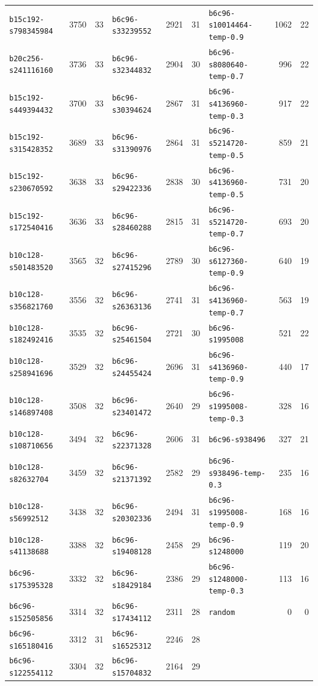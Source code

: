 \documentclass{article}
\begin{document}
\begin{table}[htbp]
\begin{tabular}{@{}lrr@{\hspace{14pt}}lrr@{\hspace{14pt}}lrr@{}}
    \texttt{b15c192-s798345984} & 3750 & 33 & \texttt{b6c96-s33239552} & 2921 & 31 & \texttt{b6c96-s10014464-temp-0.9} & 1062 & 22 \\
    \texttt{b20c256-s241116160} & 3736 & 33 & \texttt{b6c96-s32344832} & 2904 & 30 & \texttt{b6c96-s8080640-temp-0.7} & 996 & 22 \\
    \texttt{b15c192-s449394432} & 3700 & 33 & \texttt{b6c96-s30394624} & 2867 & 31 & \texttt{b6c96-s4136960-temp-0.3} & 917 & 22 \\
    \texttt{b15c192-s315428352} & 3689 & 33 & \texttt{b6c96-s31390976} & 2864 & 31 & \texttt{b6c96-s5214720-temp-0.5} & 859 & 21 \\
    \texttt{b15c192-s230670592} & 3638 & 33 & \texttt{b6c96-s29422336} & 2838 & 30 & \texttt{b6c96-s4136960-temp-0.5} & 731 & 20 \\
    \texttt{b15c192-s172540416} & 3636 & 33 & \texttt{b6c96-s28460288} & 2815 & 31 & \texttt{b6c96-s5214720-temp-0.7} & 693 & 20 \\
    \texttt{b10c128-s501483520} & 3565 & 32 & \texttt{b6c96-s27415296} & 2789 & 30 & \texttt{b6c96-s6127360-temp-0.9} & 640 & 19 \\
    \texttt{b10c128-s356821760} & 3556 & 32 & \texttt{b6c96-s26363136} & 2741 & 31 & \texttt{b6c96-s4136960-temp-0.7} & 563 & 19 \\
    \texttt{b10c128-s182492416} & 3535 & 32 & \texttt{b6c96-s25461504} & 2721 & 30 & \texttt{b6c96-s1995008} & 521 & 22 \\
    \texttt{b10c128-s258941696} & 3529 & 32 & \texttt{b6c96-s24455424} & 2696 & 31 & \texttt{b6c96-s4136960-temp-0.9} & 440 & 17 \\
    \texttt{b10c128-s146897408} & 3508 & 32 & \texttt{b6c96-s23401472} & 2640 & 29 & \texttt{b6c96-s1995008-temp-0.3} & 328 & 16 \\
    \texttt{b10c128-s108710656} & 3494 & 32 & \texttt{b6c96-s22371328} & 2606 & 31 & \texttt{b6c96-s938496} & 327 & 21 \\
    \texttt{b10c128-s82632704} & 3459 & 32 & \texttt{b6c96-s21371392} & 2582 & 29 & \texttt{b6c96-s938496-temp-0.3} & 235 & 16 \\
    \texttt{b10c128-s56992512} & 3438 & 32 & \texttt{b6c96-s20302336} & 2494 & 31 & \texttt{b6c96-s1995008-temp-0.9} & 168 & 16 \\
    \texttt{b10c128-s41138688} & 3388 & 32 & \texttt{b6c96-s19408128} & 2458 & 29 & \texttt{b6c96-s1248000} & 119 & 20 \\
    \texttt{b6c96-s175395328} & 3332 & 32 & \texttt{b6c96-s18429184} & 2386 & 29 & \texttt{b6c96-s1248000-temp-0.3} & 113 & 16 \\
    \texttt{b6c96-s152505856} & 3314 & 32 & \texttt{b6c96-s17434112} & 2311 & 28 & \texttt{random} & 0 & 0 \\
    \texttt{b6c96-s165180416} & 3312 & 31 & \texttt{b6c96-s16525312} & 2246 & 28 &  &  &  \\
    \texttt{b6c96-s122554112} & 3304 & 32 & \texttt{b6c96-s15704832} & 2164 & 29 &  &  &  \\
    \bottomrule
  \end{tabular}
\end{table}
\end{document}
